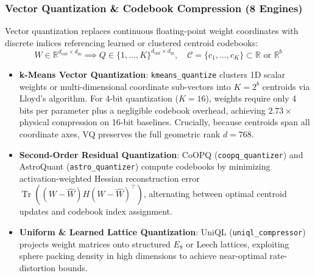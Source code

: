 \documentclass{article}
\begin{document}
\subsubsection{Vector Quantization \& Codebook Compression (8 Engines)}
Vector quantization replaces continuous floating-point weight coordinates with discrete indices referencing learned or clustered centroid codebooks:
\begin{equation}
    W \in \mathbb{R}^{d_{\text{out}} \times d_{\text{in}}} \implies Q \in \{1, \dots, K\}^{d_{\text{out}} \times d_{\text{in}}}, \quad \mathcal{C} = \{c_1, \dots, c_K\} \subset \mathbb{R} \text{ or } \mathbb{R}^b
\end{equation}
\begin{itemize}
    \item \textbf{k-Means Vector Quantization}: \texttt{kmeans\_quantize} \citep{stock2020and} clusters 1D scalar weights or multi-dimensional coordinate sub-vectors into $K = 2^b$ centroids via Lloyd's algorithm. For 4-bit quantization ($K=16$), weights require only 4 bits per parameter plus a negligible codebook overhead, achieving $2.73\times$ physical compression on 16-bit baselines. Crucially, because centroids span all coordinate axes, VQ preserves the full geometric rank $d=768$.
    \item \textbf{Second-Order Residual Quantization}: CoOPQ (\texttt{coopq\_quantizer}) and AstroQuant (\texttt{astro\_quantizer}) compute codebooks by minimizing activation-weighted Hessian reconstruction error $\operatorname{Tr}((W - \hat{W}) H (W - \hat{W})^\top)$, alternating between optimal centroid updates and codebook index assignment.
    \item \textbf{Uniform \& Learned Lattice Quantization}: UniQL (\texttt{uniql\_compressor}) projects weight matrices onto structured $E_8$ or Leech lattices, exploiting sphere packing density in high dimensions to achieve near-optimal rate-distortion bounds.
\end{itemize}
\end{document}
